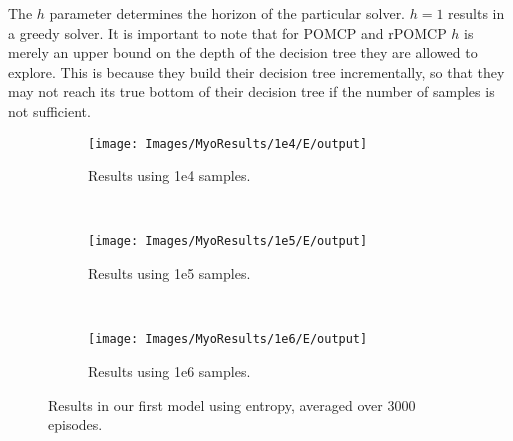 The $h$ parameter determines the horizon of the particular solver. $h = 1$ results in a greedy
solver. It is important to note that for POMCP and rPOMCP $h$ is merely an upper bound on the depth
of the decision tree they are allowed to explore. This is because they build their decision tree
incrementally, so that they may not reach its true bottom of their decision tree if the number of
samples is not sufficient.

\begin{figure}[ht]
        \centering
        \begin{subfigure}[t]{0.3\textwidth}
                \texttt{[image: Images/MyoResults/1e4/E/output]}
                \caption{Results using 1e4 samples.}
                \label{fig:m4e}
        \end{subfigure}%
        ~ %
        \begin{subfigure}[t]{0.3\textwidth}
                \texttt{[image: Images/MyoResults/1e5/E/output]}
                \caption{Results using 1e5 samples.}
                \label{fig:m5e}
        \end{subfigure}
        ~ %
        \begin{subfigure}[t]{0.3\textwidth}
                \texttt{[image: Images/MyoResults/1e6/E/output]}
                \caption{Results using 1e6 samples.}
                \label{fig:m6e}
        \end{subfigure}
        \caption{Results in our first model using entropy, averaged over 3000 episodes.}
        \label{ref:myoentropyfig}
\end{figure}




